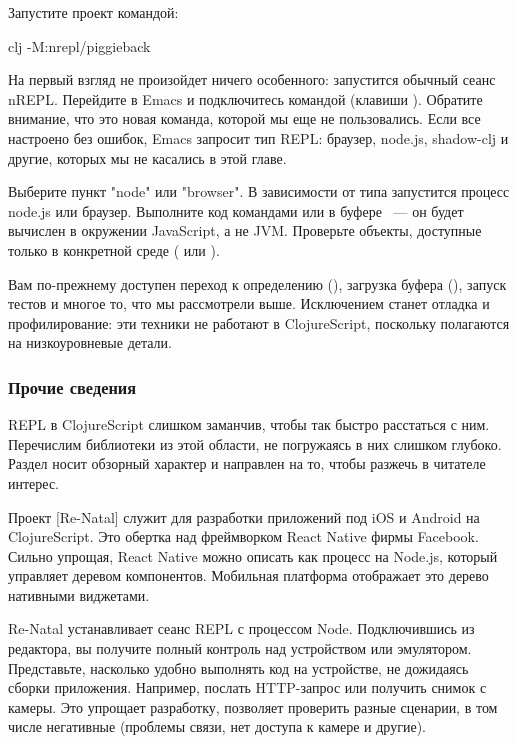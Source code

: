 Запустите проект командой:

\begin{english}
  \begin{bash}
clj -M:nrepl/piggieback
  \end{bash}
\end{english}

На первый взгляд не произойдет ничего особенного: запустится обычный сеанс nREPL. Перейдите в Emacs и подключитесь командой  (клавиши ). Обратите внимание, что это новая команда, которой мы еще не пользовались. Если все настроено без ошибок, Emacs запросит тип REPL: браузер, node.js, shadow-clj и другие, которых мы не касались в этой главе.

Выберите пункт "node" или "browser". В зависимости от типа запустится процесс node.js или браузер. Выполните код командами  или в буфере ~--- он будет вычислен в окружении JavaScript, а не JVM. Проверьте объекты, доступные только в конкретной среде ( или ).

Вам по-прежнему доступен переход к определению (), загрузка буфера (), запуск тестов и многое то, что мы рассмотрели выше. Исключением станет отладка и профилирование: эти техники не работают в ClojureScript, поскольку полагаются на низкоуровневые детали.

\subsubsection{Прочие сведения}

REPL в ClojureScript слишком заманчив, чтобы так быстро расстаться с ним. Перечислим библиотеки из этой области, не погружаясь в них слишком глубоко. Раздел носит обзорный характер и направлен на то, чтобы разжечь в читателе интерес.

\def\urlrenatal{https://github.com/drapanjanas/re-natal}

Проект \footurl{Re-Natal}{\urlrenatal}[Re-\-Natal] служит для разработки приложений под iOS и Android на ClojureScript. Это обертка над фреймворком React Native фирмы Facebook. Сильно упрощая, React Native можно описать как процесс на Node.js, который управляет деревом компонентов. Мобильная платформа отображает это дерево нативными виджетами.

Re-Natal устанавливает сеанс REPL с процессом Node. Подключившись из редактора, вы получите полный контроль над устройством или эмулятором. Представьте, насколько удобно выполнять код на устройстве, не дожидаясь сборки приложения. Например, послать HTTP-запрос или получить снимок с камеры. Это упрощает разработку, позволяет проверить разные сценарии, в том числе негативные (проблемы связи, нет доступа к камере и другие).

